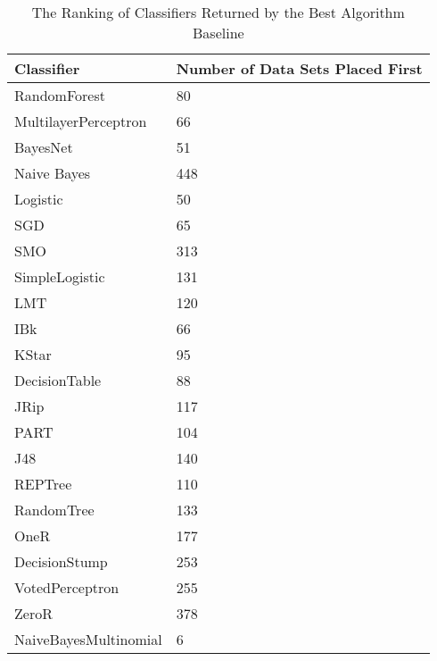 \begin{table}[h]
\centering
	\begin{tabularx}{\textwidth}{X | X}
		Classifier				&	Number of Data Sets Placed First \\	\hline
		RandomForest				&	80								\\	\hline
		MultilayerPerceptron		&	66								\\	\hline
		BayesNet					&	51								\\	\hline
		Naive Bayes				&	448								\\	\hline	
		Logistic					&	50								\\	\hline	
		SGD						&	65								\\	\hline
		SMO						&	313								\\	\hline
		SimpleLogistic			&	131								\\	\hline
		LMT						&	120								\\	\hline	
		IBk						&	66								\\	\hline	
		KStar					&	95								\\	\hline	
		DecisionTable			&	88								\\	\hline
		JRip						&	117								\\	\hline
		PART						&	104								\\	\hline
		J48						&	140								\\	\hline	
		REPTree					&	110								\\	\hline
		RandomTree				&	133								\\	\hline	
		OneR						&	177								\\	\hline						
		DecisionStump			&	253								\\	\hline
		VotedPerceptron			&	255								\\	\hline	
		ZeroR					&	378								\\	\hline	
		NaiveBayesMultinomial	&	6								\\	\hline	
	\end{tabularx}
	\caption{The Ranking of Classifiers Returned by the Best Algorithm Baseline}
	\label{tab:bestAlgorithmRanking}
\end{table}